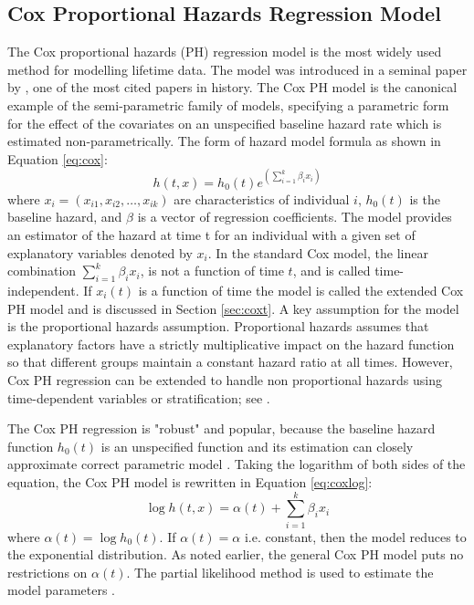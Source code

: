 \subsection{Cox Proportional Hazards Regression Model} \label{Cox.mod}
The Cox proportional hazards (PH) regression model is the most widely used method for modelling lifetime data. The model was introduced in a seminal paper by \citet{cox1972}, one of the most cited papers in history. The Cox PH model is the canonical example of the semi-parametric family of models, specifying a parametric form for the effect of the covariates on an unspecified baseline hazard rate which is estimated non-parametrically.
The form of hazard model formula as shown in Equation \ref{eq:cox}:
\begin{equation}
\label{eq:cox}
h(t,x)=h_0(t)e^{(\sum_{i=1}^{k}\beta_ix_i)}
\end{equation}
where $x_i=(x_{i1}, x_{i2}, \ldots, x_{ik})$ are characteristics of individual $i$, $h_0(t)$ is the baseline hazard, and $\beta$  is a vector of regression coefficients.
The model provides an estimator of the hazard at time t for an individual with a given set of explanatory variables denoted by $x_i$.  In the standard Cox model, the linear combination $\sum_{i=1}^{k}\beta_i x_i$, is not a function of time $t$, and is called time-independent.  If $x_i(t)$ is a function of time the model is called the extended Cox PH model and is discussed in Section \ref{sec:coxt}. A key assumption for the model is the proportional hazards assumption. Proportional hazards assumes that explanatory factors have a strictly multiplicative impact on the hazard function so that different groups maintain a constant hazard ratio at all times. However, Cox PH regression can be extended to handle non proportional hazards using time-dependent variables or stratification; see \cite{kleinMosch2003}.

The Cox PH regression is "robust" and popular, because the baseline hazard function $h_0 (t)$ is an unspecified function and its estimation can closely approximate correct parametric model \citep{kleinbaum1998}. Taking the logarithm of both sides of the equation, the Cox PH model is rewritten in Equation \ref{eq:coxlog}:
\begin{equation}
\label{eq:coxlog}
\log{h(t,x)}=\alpha(t)+\sum_{i=1}^{k}\beta_ix_i
\end{equation}
where $\alpha(t)=\log{h_0(t)}$. If $\alpha(t)=\alpha$ i.e. constant, then the model reduces to the exponential distribution. As noted earlier, the general Cox PH model puts no restrictions on $\alpha(t)$.  The partial likelihood method is used to estimate the model parameters \citep{allison1995}. %

